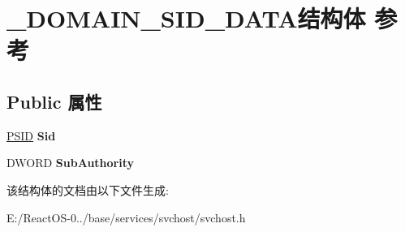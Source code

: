 \hypertarget{struct___d_o_m_a_i_n___s_i_d___d_a_t_a}{}\section{\+\_\+\+D\+O\+M\+A\+I\+N\+\_\+\+S\+I\+D\+\_\+\+D\+A\+T\+A结构体 参考}
\label{struct___d_o_m_a_i_n___s_i_d___d_a_t_a}
\subsection*{Public 属性}
\begin{DoxyCompactItemize}
\item 
\mbox{\label{struct___d_o_m_a_i_n___s_i_d___d_a_t_a_ae499bf3813e1ae9c0f8bc7eebbd49927}} 
\hyperlink{struct___s_i_d}{P\+S\+ID} {\bfseries Sid}
\item 
\mbox{\label{struct___d_o_m_a_i_n___s_i_d___d_a_t_a_ad86263fd764a07ffe70195426d290446}} 
D\+W\+O\+RD {\bfseries Sub\+Authority}
\end{DoxyCompactItemize}


该结构体的文档由以下文件生成\+:\begin{DoxyCompactItemize}
\item 
E\+:/\+React\+O\+S-\/0../base/services/svchost/svchost.\+h\end{DoxyCompactItemize}
